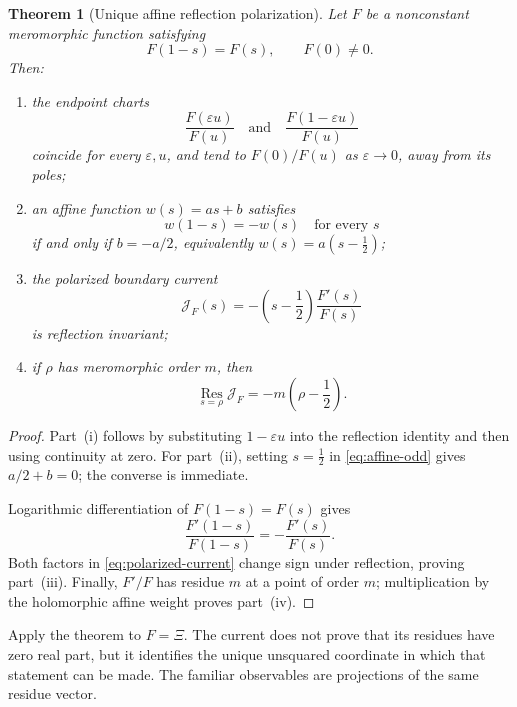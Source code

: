 \documentclass[11pt]{article}
\newtheorem{theorem}{Theorem}[section]
\theoremstyle{definition}
\theoremstyle{remark}
\begin{document}
\begin{theorem}[Unique affine reflection polarization]\label{thm:affine-polarization}
Let \(F\) be a nonconstant meromorphic function satisfying
\[
 F(1-s)=F(s),\qquad F(0)\ne0.
 \tag{8.1}
\]
Then:
\begin{enumerate}[label=\textup{(\roman*)}]
\item the endpoint charts
\[
 \frac{F(\varepsilon u)}{F(u)}
 \quad\text{and}\quad
 \frac{F(1-\varepsilon u)}{F(u)}
 \tag{8.2}
\]
coincide for every \(\varepsilon,u\), and tend to \(F(0)/F(u)\) as
\(\varepsilon\to0\), away from its poles;
\item an affine function \(w(s)=as+b\) satisfies
\[
 w(1-s)=-w(s)\quad\text{for every }s
 \label{eq:affine-odd}
 \tag{8.3}
\]
if and only if \(b=-a/2\), equivalently \(w(s)=a(s-\tfrac12)\);
\item the polarized boundary current
\begin{equation}
 \mathcal J_F(s)=
 -\left(s-\frac12\right)\frac{F'(s)}{F(s)}
 \label{eq:polarized-current}
\end{equation}
is reflection invariant;
\item if \(\rho\) has meromorphic order \(m\), then
\begin{equation}
 \operatorname*{Res}_{s=\rho}\mathcal J_F
 =-m\left(\rho-\frac12\right).
 \label{eq:polarized-residue}
\end{equation}
\end{enumerate}
\end{theorem}

\begin{proof}
Part~\textup{(i)} follows by substituting \(1-\varepsilon u\) into the reflection identity and
then using continuity at zero.  For part~\textup{(ii)}, setting \(s=\tfrac12\) in
\eqref{eq:affine-odd} gives \(a/2+b=0\); the converse is immediate.

Logarithmic differentiation of \(F(1-s)=F(s)\) gives
\[
 \frac{F'(1-s)}{F(1-s)}=-\frac{F'(s)}{F(s)}.
 \tag{8.6}
\]
Both factors in \eqref{eq:polarized-current} change sign under reflection, proving
part~\textup{(iii)}.  Finally, \(F'/F\) has residue \(m\) at a point of order \(m\);
multiplication by the holomorphic affine weight proves part~\textup{(iv)}.
\end{proof}

Apply the theorem to \(F=\Xi\).  The current does not prove that its residues have zero real
part, but it identifies the unique unsquared coordinate in which that statement can be made.
The familiar observables are projections of the same residue vector.
\end{document}
